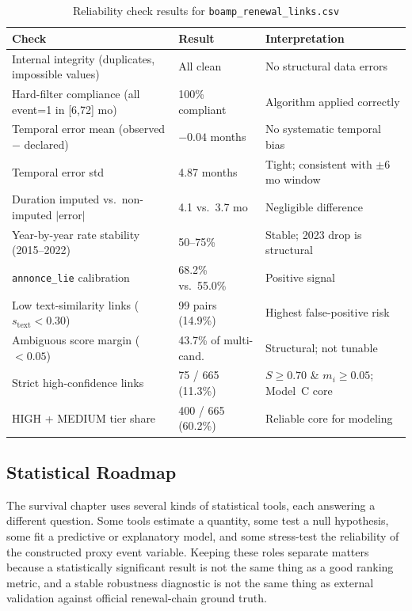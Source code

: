 \documentclass[12pt, a4paper]{article}
\begin{document}
\clearpage
\begin{landscape}
\thispagestyle{empty}
\begin{table}[p]
\centering
\caption{Reliability check results for \texttt{boamp\_renewal\_links.csv}}
\small
\begin{tabularx}{\linewidth}{@{}X P{4.2cm} X@{}}
\toprule
Check & Result & Interpretation \\
\midrule
Internal integrity (duplicates, impossible values) & All clean & No structural data errors \\[4pt]
Hard-filter compliance (all event=1 in [6,72] mo) & 100\% compliant & Algorithm applied correctly \\[4pt]
Temporal error mean (observed $-$ declared) & $-0.04$ months & No systematic temporal bias \\[4pt]
Temporal error std & 4.87 months & Tight; consistent with $\pm$6 mo window \\[4pt]
Duration imputed vs.\ non-imputed $|$error$|$ & 4.1 vs.\ 3.7 mo & Negligible difference \\[4pt]
Year-by-year rate stability (2015--2022) & 50--75\% & Stable; 2023 drop is structural \\[4pt]
\texttt{annonce\_lie} calibration & 68.2\% vs.\ 55.0\% & Positive signal \\[4pt]
Low text-similarity links ($s_{\text{text}} < 0.30$) & 99 pairs (14.9\%) & Highest false-positive risk \\[4pt]
Ambiguous score margin ($<0.05$) & 43.7\% of multi-cand. & Structural; not tunable \\[4pt]
Strict high-confidence links & 75 / 665 (11.3\%) & $S \geq 0.70$ \& $m_i \geq 0.05$; Model~C core \\[4pt]
HIGH + MEDIUM tier share & 400 / 665 (60.2\%) & Reliable core for modeling \\
\bottomrule
\end{tabularx}
\normalsize
\end{table}
\end{landscape}
\clearpage

\subsection{Statistical Roadmap}

The survival chapter uses several kinds of statistical tools, each answering a
different question. Some tools estimate a quantity, some test a null
hypothesis, some fit a predictive or explanatory model, and some stress-test
the reliability of the constructed proxy event variable. Keeping these roles
separate matters because a statistically significant result is not the same
thing as a good ranking metric, and a stable robustness diagnostic is not the
same thing as external validation against official renewal-chain ground truth.
\end{document}
